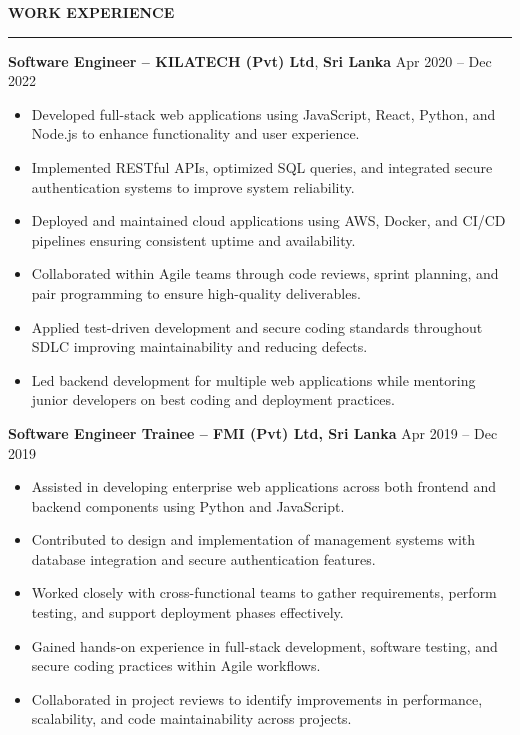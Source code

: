 \documentclass[10pt,letterpaper]{article}
\begin{document}
\vspace{8pt}

\textbf{WORK EXPERIENCE}\\[-8pt]
\noindent\rule{\textwidth}{1pt}

\vspace{-2pt}

\textbf{Software Engineer -- KILATECH (Pvt) Ltd}, \textbf{Sri Lanka} \hfill Apr 2020 -- Dec 2022

\vspace{-1pt}

\begin{itemize}
\item Developed full-stack web applications using JavaScript, React, Python, and Node.js to enhance functionality and user experience.
\item Implemented RESTful APIs, optimized SQL queries, and integrated secure authentication systems to improve system reliability.
\item Deployed and maintained cloud applications using AWS, Docker, and CI/CD pipelines ensuring consistent uptime and availability.
\item Collaborated within Agile teams through code reviews, sprint planning, and pair programming to ensure high-quality deliverables.
\item Applied test-driven development and secure coding standards throughout SDLC improving maintainability and reducing defects.
\item Led backend development for multiple web applications while mentoring junior developers on best coding and deployment practices.
\end{itemize}

\textbf{Software Engineer Trainee -- FMI (Pvt) Ltd, Sri Lanka} \hfill Apr 2019 -- Dec 2019

\vspace{-1pt}

\begin{itemize}
\item Assisted in developing enterprise web applications across both frontend and backend components using Python and JavaScript.
\item Contributed to design and implementation of management systems with database integration and secure authentication features.
\item Worked closely with cross-functional teams to gather requirements, perform testing, and support deployment phases effectively.
\item Gained hands-on experience in full-stack development, software testing, and secure coding practices within Agile workflows.
\item Collaborated in project reviews to identify improvements in performance, scalability, and code maintainability across projects.
\end{itemize}
\end{document}
